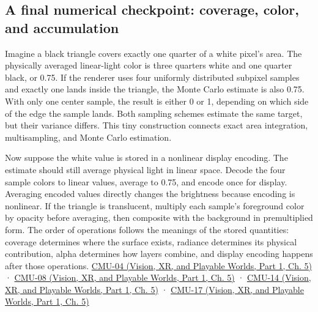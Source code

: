 \subsection{A final numerical checkpoint: coverage, color, and accumulation}\label{03-visual-computing-i-ch015-a-final-numerical-checkpoint-coverage-color-and-accumulation}

\hypertarget{03-visual-computing-i-ch015-a-final-numerical-checkpoint-coverage-color-and-accumulation}{}

Imagine a black triangle covers exactly one quarter of a white pixel's area. The physically averaged linear-light color is three quarters white and one quarter black, or 0.75. If the renderer uses four uniformly distributed subpixel samples and exactly one lands inside the triangle, the Monte Carlo estimate is also 0.75. With only one center sample, the result is either 0 or 1, depending on which side of the edge the sample lands. Both sampling schemes estimate the same target, but their variance differs. This tiny construction connects exact area integration, multisampling, and Monte Carlo estimation.

Now suppose the white value is stored in a nonlinear display encoding. The estimate should still average physical light in linear space. Decode the four sample colors to linear values, average to 0.75, and encode once for display. Averaging encoded values directly changes the brightness because encoding is nonlinear. If the triangle is translucent, multiply each sample's foreground color by opacity before averaging, then composite with the background in premultiplied form. The order of operations follows the meanings of the stored quantities: coverage determines where the surface exists, radiance determines its physical contribution, alpha determines how layers combine, and display encoding happens after those operations. \href{../07-Vision-XR-and-Playable-Worlds-P01/main.pdf\#nameddest=04-visual-computing-ii-ch036-cmu-04---drawing-a-triangle-and-an-intro-to-sampling}{CMU-04 (Vision, XR, and Playable Worlds, Part 1, Ch. 5)} · \href{../07-Vision-XR-and-Playable-Worlds-P01/main.pdf\#nameddest=04-visual-computing-ii-ch036-cmu-08---depth-and-transparency}{CMU-08 (Vision, XR, and Playable Worlds, Part 1, Ch. 5)} · \href{../07-Vision-XR-and-Playable-Worlds-P01/main.pdf\#nameddest=04-visual-computing-ii-ch036-cmu-14---color}{CMU-14 (Vision, XR, and Playable Worlds, Part 1, Ch. 5)} · \href{../07-Vision-XR-and-Playable-Worlds-P01/main.pdf\#nameddest=04-visual-computing-ii-ch036-cmu-17---numerical-integration}{CMU-17 (Vision, XR, and Playable Worlds, Part 1, Ch. 5)}

